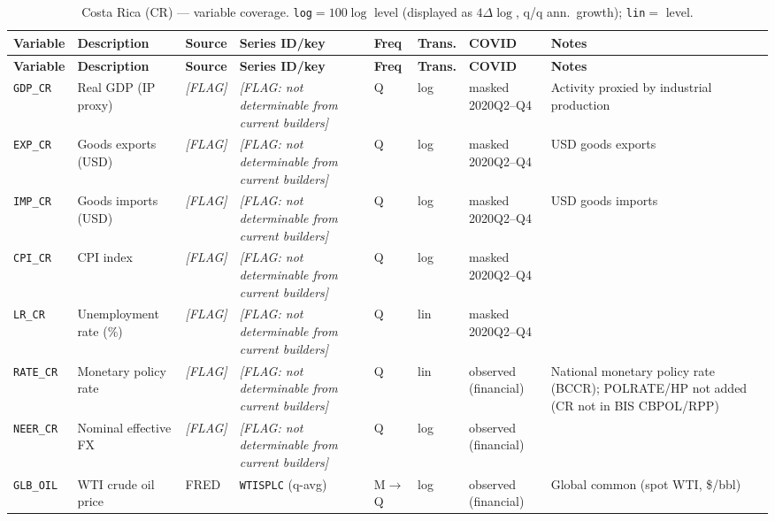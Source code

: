 {\footnotesize
\begin{longtable}{@{}p{2.0cm}p{2.7cm}p{1.4cm}p{2.8cm}p{0.7cm}p{0.85cm}p{1.5cm}p{2.3cm}@{}}
\caption{Costa Rica (CR) --- variable coverage.  \texttt{log}$=100\log$
level (displayed as $4\Delta\log$, q/q ann.\ growth); \texttt{lin}$=$ level.}
\label{tab:data:CR}\\
\toprule
\textbf{Variable} & \textbf{Description} & \textbf{Source} & \textbf{Series ID/key} & \textbf{Freq} & \textbf{Trans.} & \textbf{COVID} & \textbf{Notes} \\
\midrule \endfirsthead
\toprule
\textbf{Variable} & \textbf{Description} & \textbf{Source} & \textbf{Series ID/key} & \textbf{Freq} & \textbf{Trans.} & \textbf{COVID} & \textbf{Notes} \\
\midrule \endhead
\bottomrule \endfoot
\texttt{GDP\_CR}    & Real GDP (IP proxy)           & \textit{[FLAG]} & \textit{[FLAG: not determinable from current builders]} & Q & log & masked 2020Q2--Q4 & Activity proxied by industrial production \\
\texttt{EXP\_CR}    & Goods exports (USD)           & \textit{[FLAG]} & \textit{[FLAG: not determinable from current builders]} & Q & log & masked 2020Q2--Q4 & USD goods exports \\
\texttt{IMP\_CR}    & Goods imports (USD)           & \textit{[FLAG]} & \textit{[FLAG: not determinable from current builders]} & Q & log & masked 2020Q2--Q4 & USD goods imports \\
\texttt{CPI\_CR}    & CPI index                     & \textit{[FLAG]} & \textit{[FLAG: not determinable from current builders]} & Q & log & masked 2020Q2--Q4 & \\
\texttt{LR\_CR}     & Unemployment rate (\%)        & \textit{[FLAG]} & \textit{[FLAG: not determinable from current builders]} & Q & lin & masked 2020Q2--Q4 & \\
\texttt{RATE\_CR}   & Monetary policy rate          & \textit{[FLAG]} & \textit{[FLAG: not determinable from current builders]} & Q & lin & observed (financial) & National monetary policy rate (BCCR); POLRATE/HP not added (CR not in BIS CBPOL/RPP) \\
\texttt{NEER\_CR}   & Nominal effective FX          & \textit{[FLAG]} & \textit{[FLAG: not determinable from current builders]} & Q & log & observed (financial) & \\
\texttt{GLB\_OIL}   & WTI crude oil price           & FRED & \texttt{WTISPLC} (q-avg)                               & M$\to$Q & log & observed (financial) & Global common (spot WTI, \$/bbl) \\

\end{longtable}}

